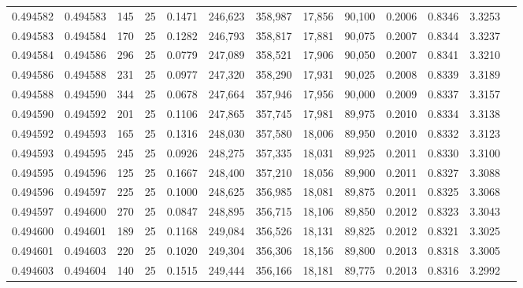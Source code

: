 \begin{tabular}{rrrrrrrrrrrrr}
0.494582 & 0.494583 &   145 &  25 &                                     0.1471 & 246,623 & 358,987 &  17,856 &  90,100 & 0.2006 & 0.8346 & 3.3253 \\
0.494583 & 0.494584 &   170 &  25 &                                     0.1282 & 246,793 & 358,817 &  17,881 &  90,075 & 0.2007 & 0.8344 & 3.3237 \\
0.494584 & 0.494586 &   296 &  25 &                                     0.0779 & 247,089 & 358,521 &  17,906 &  90,050 & 0.2007 & 0.8341 & 3.3210 \\
0.494586 & 0.494588 &   231 &  25 &                                     0.0977 & 247,320 & 358,290 &  17,931 &  90,025 & 0.2008 & 0.8339 & 3.3189 \\
0.494588 & 0.494590 &   344 &  25 &                                     0.0678 & 247,664 & 357,946 &  17,956 &  90,000 & 0.2009 & 0.8337 & 3.3157 \\
0.494590 & 0.494592 &   201 &  25 &                                     0.1106 & 247,865 & 357,745 &  17,981 &  89,975 & 0.2010 & 0.8334 & 3.3138 \\
0.494592 & 0.494593 &   165 &  25 &                                     0.1316 & 248,030 & 357,580 &  18,006 &  89,950 & 0.2010 & 0.8332 & 3.3123 \\
0.494593 & 0.494595 &   245 &  25 &                                     0.0926 & 248,275 & 357,335 &  18,031 &  89,925 & 0.2011 & 0.8330 & 3.3100 \\
0.494595 & 0.494596 &   125 &  25 &                                     0.1667 & 248,400 & 357,210 &  18,056 &  89,900 & 0.2011 & 0.8327 & 3.3088 \\
0.494596 & 0.494597 &   225 &  25 &                                     0.1000 & 248,625 & 356,985 &  18,081 &  89,875 & 0.2011 & 0.8325 & 3.3068 \\
0.494597 & 0.494600 &   270 &  25 &                                     0.0847 & 248,895 & 356,715 &  18,106 &  89,850 & 0.2012 & 0.8323 & 3.3043 \\
0.494600 & 0.494601 &   189 &  25 &                                     0.1168 & 249,084 & 356,526 &  18,131 &  89,825 & 0.2012 & 0.8321 & 3.3025 \\
0.494601 & 0.494603 &   220 &  25 &                                     0.1020 & 249,304 & 356,306 &  18,156 &  89,800 & 0.2013 & 0.8318 & 3.3005 \\
0.494603 & 0.494604 &   140 &  25 &                                     0.1515 & 249,444 & 356,166 &  18,181 &  89,775 & 0.2013 & 0.8316 & 3.2992 \\

\end{tabular}
